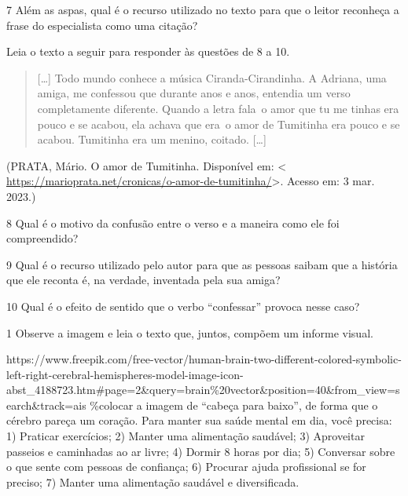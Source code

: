 \num{7} Além as aspas, qual é o recurso utilizado no texto para que o
leitor reconheça a frase do especialista como uma citação?



Leia o texto a seguir para responder às questões de 8 a 10.

\begin{quote}
{[}\ldots{]} Todo mundo conhece a música Ciranda-Cirandinha. A Adriana,
uma amiga, me confessou que durante anos e anos, entendia um verso
completamente diferente. Quando a letra fala~o amor que tu me tinhas era
pouco e se acabou, ela achava que era~o amor de Tumitinha era pouco e se
acabou. Tumitinha era um menino, coitado. {[}\ldots{]}
\end{quote}

(PRATA, Mário. O amor de Tumitinha. Disponível em: \textless{}
\url{https://marioprata.net/cronicas/o-amor-de-tumitinha/}\textgreater.
Acesso em: 3 mar. 2023.)

\num{8} Qual é o motivo da confusão entre o verso e a maneira como ele
foi compreendido?



\num{9} Qual é o recurso utilizado pelo autor para que as pessoas saibam
que a história que ele reconta é, na verdade, inventada pela sua amiga?



\num{10} Qual é o efeito de sentido que o verbo ``confessar'' provoca
nesse caso?




\num{1} Observe a imagem e leia o texto que, juntos, compõem um informe
visual.

https://www.freepik.com/free-vector/human-brain-two-different-colored-symbolic-left-right-cerebral-hemispheres-model-image-icon-abst\_4188723.htm\#page=2\&query=brain\%20vector\&position=40\&from\_view=search\&track=ais
\%colocar a imagem de ``cabeça para baixo'', de forma que o cérebro
pareça um coração. Para manter sua saúde mental em dia, você precisa: 1)
Praticar exercícios; 2) Manter uma alimentação saudável; 3) Aproveitar
passeios e caminhadas ao ar livre; 4) Dormir 8 horas por dia; 5)
Conversar sobre o que sente com pessoas de confiança; 6) Procurar ajuda
profissional se for preciso; 7) Manter uma alimentação saudável e
diversificada.

